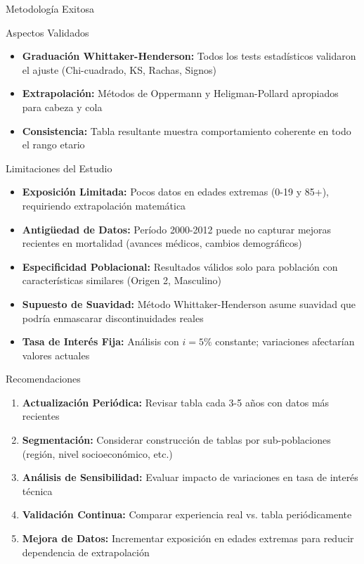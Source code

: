 \begin{frame}{Metodología Exitosa}
  \begin{block}{Aspectos Validados}
    \begin{itemize}
      \item \textbf{Graduación Whittaker-Henderson:} Todos los tests estadísticos validaron el ajuste (Chi-cuadrado, KS, Rachas, Signos)
      \item \textbf{Extrapolación:} Métodos de Oppermann y Heligman-Pollard apropiados para cabeza y cola
      \item \textbf{Consistencia:} Tabla resultante muestra comportamiento coherente en todo el rango etario
    \end{itemize}
  \end{block}
\end{frame}

\begin{frame}{Limitaciones del Estudio}
  \begin{itemize}
    \item \textbf{Exposición Limitada:} Pocos datos en edades extremas (0-19 y 85+), requiriendo extrapolación matemática
    \item \textbf{Antigüedad de Datos:} Período 2000-2012 puede no capturar mejoras recientes en mortalidad (avances médicos, cambios demográficos)
    \item \textbf{Especificidad Poblacional:} Resultados válidos solo para población con características similares (Origen 2, Masculino)
    \item \textbf{Supuesto de Suavidad:} Método Whittaker-Henderson asume suavidad que podría enmascarar discontinuidades reales
    \item \textbf{Tasa de Interés Fija:} Análisis con $i = 5\%$ constante; variaciones afectarían valores actuales
  \end{itemize}
\end{frame}

\begin{frame}{Recomendaciones}
  \begin{enumerate}
    \item \textbf{Actualización Periódica:} Revisar tabla cada 3-5 años con datos más recientes
    \item \textbf{Segmentación:} Considerar construcción de tablas por sub-poblaciones (región, nivel socioeconómico, etc.)
    \item \textbf{Análisis de Sensibilidad:} Evaluar impacto de variaciones en tasa de interés técnica
    \item \textbf{Validación Continua:} Comparar experiencia real vs. tabla periódicamente
    \item \textbf{Mejora de Datos:} Incrementar exposición en edades extremas para reducir dependencia de extrapolación
  \end{enumerate}
\end{frame}

